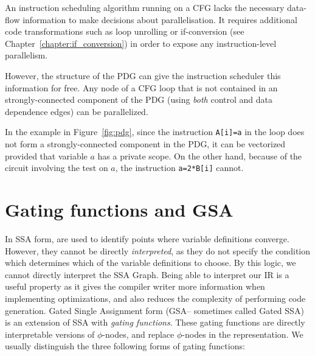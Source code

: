 An instruction scheduling algorithm running on a CFG lacks the necessary data-flow information to make decisions about parallelisation. It requires additional code transformations such as loop unrolling or if-conversion (see Chapter~\ref{chapter:if_conversion}) in order to expose any instruction-level parallelism.

However, the structure of the PDG can give the instruction scheduler this information for free. Any node of a CFG loop that is not contained in an strongly-connected component of the PDG (using \textit{both} control and data dependence edges) can be parallelized. 

In the example in Figure~\ref{fig:pdg}, since the instruction \texttt{A[i]=a} in the loop does not form a strongly-connected component in the PDG, it can be vectorized provided that variable $a$ has a private scope. 
On the other hand, because of the circuit involving the test on $a$, the instruction \texttt{a=2*B[i]} cannot.


\section{Gating functions and GSA}
\label{sec:gating_functions}
In SSA form, \phifuns are used to identify points where variable definitions converge. 
However, they cannot be directly \textit{interpreted}, as they do not specify the condition which determines which of the variable definitions to choose. 
By this logic, we cannot directly interpret the SSA Graph. 
Being able to interpret our IR is a useful property as it gives the compiler writer more information when implementing optimizations, and also reduces the complexity of performing code generation. 
Gated Single Assignment form (GSA-- sometimes called Gated SSA) is an extension of SSA with \textit{gating functions}. 
These gating functions are directly interpretable versions of $\phi$-nodes, and replace $\phi$-nodes in the representation. 
We usually distinguish the three following forms of gating functions:

